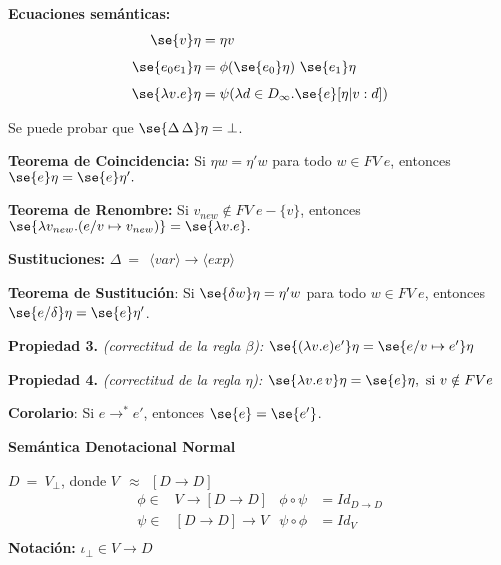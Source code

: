 \begin{section}
\smallskip


\textbf{Ecuaciones semánticas:}
\begin{align*}
    \se{v}\eta &= \eta v\\[1ex]
    \se{e_0 e_1}\eta &= \phi(\se{e_0}\eta)\ \se{e_1}\eta\\[1ex]
    \se{\lambda v.e}\eta &= \psi(\lambda d\in D_\infty. \se{e}[\eta|v:d])
\end{align*}

\smallskip

Se puede probar que $\se{\Delta\,\Delta}\eta = \bot$.

\textbf{Teorema de Coincidencia:}
Si $\eta w = \eta' w$ para todo $w\in FV\ e$, entonces
$\se{e}\eta = \se{e}\eta'.$

\smallskip

\textbf{Teorema de Renombre:} Si $v_{new}\notin FV\ e-\{v\}$,
entonces $\se{\lambda v_{new}.(e/v\mapsto v_{new})} = \se{\lambda v.e}.$ \pause

\smallskip

\textbf{Sustituciones:} $\Delta \ = \ \ \langle var\rangle \rightarrow  \langle exp\rangle$

\smallskip

\textbf{Teorema de Sustitución}: Si $\se{\delta w}\eta = \eta' w$ para todo $w \in FV\ e$, entonces $\se{e/\delta}\eta = \se{e}\eta'$.

\smallskip

\textbf{Propiedad 3.} \textit{(correctitud de la regla $\beta$):} $\se{(\lambda v.e)e'}\eta = \se{e/v\mapsto e'}\eta$

\smallskip

\textbf{Propiedad 4.} \textit{(correctitud de la regla $\eta$):} $\se{\lambda v.e\,v}\eta = \se{e}\eta, \text{ si } v\notin FV e$

\smallskip

\textbf{Corolario}: Si $e \rightarrow^\ast e'$, entonces $\se{e} = \se{e'}$.

\bigskip

\textbf{Semántica Denotacional Normal}

\smallskip
$D \ =\ V_\perp$, donde $V\ \ \approx\ \  [D\rightarrow D]$
\begin{align*}
\phi\in & V\rightarrow [D\rightarrow D] & \phi \circ \psi &= Id_{D\rightarrow D}\\
\psi\in &[D\rightarrow D] \rightarrow V & \psi\circ\phi &= Id_{V} \\
\end{align*}
\textbf{Notación: } $ \iota_\perp\in V\rightarrow D $


\end{section}
